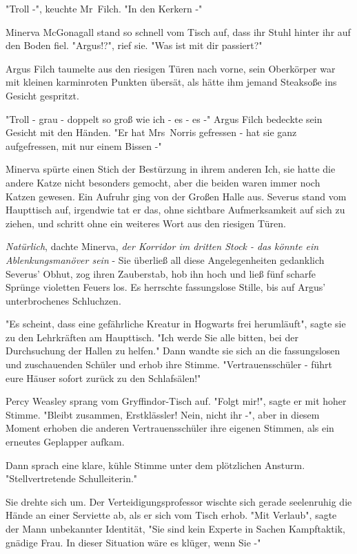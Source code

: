 {"Troll -", keuchte Mr~Filch. "In den Kerkern -"

Minerva McGonagall stand so schnell vom Tisch auf, dass ihr Stuhl hinter ihr auf den Boden fiel. "Argus!?", rief sie. "Was ist mit dir passiert?"

Argus Filch taumelte aus den riesigen Türen nach vorne, sein Oberkörper war mit kleinen karminroten Punkten übersät, als hätte ihm jemand Steaksoße ins Gesicht gespritzt.

"Troll - grau - doppelt so groß wie ich - es - es -" Argus Filch bedeckte sein Gesicht mit den Händen. "Er hat Mrs~Norris gefressen - hat sie ganz aufgefressen, mit nur einem Bissen -"

Minerva spürte einen Stich der Bestürzung in ihrem anderen Ich, sie hatte die andere Katze nicht besonders gemocht, aber die beiden waren immer noch Katzen gewesen. Ein Aufruhr ging von der Großen Halle aus. Severus stand vom Haupttisch auf, irgendwie tat er das, ohne sichtbare Aufmerksamkeit auf sich zu ziehen, und schritt ohne ein weiteres Wort aus den riesigen Türen.

\emph{Natürlich}, dachte Minerva, \emph{der Korridor im dritten Stock - das könnte ein Ablenkungsmanöver sein} - Sie überließ all diese Angelegenheiten gedanklich Severus' Obhut, zog ihren Zauberstab, hob ihn hoch und ließ fünf scharfe Sprünge violetten Feuers los. Es herrschte fassungslose Stille, bis auf Argus' unterbrochenes Schluchzen.

"Es scheint, dass eine gefährliche Kreatur in Hogwarts frei herumläuft", sagte sie zu den Lehrkräften am Haupttisch. "Ich werde Sie alle bitten, bei der Durchsuchung der Hallen zu helfen." Dann wandte sie sich an die fassungslosen und zuschauenden Schüler und erhob ihre Stimme. "Vertrauensschüler - führt eure Häuser sofort zurück zu den Schlafsälen!"

Percy Weasley sprang vom Gryffindor-Tisch auf. "Folgt mir!", sagte er mit hoher Stimme. "Bleibt zusammen, Erstklässler! Nein, nicht ihr -", aber in diesem Moment erhoben die anderen Vertrauensschüler ihre eigenen Stimmen, als ein erneutes Geplapper aufkam.

Dann sprach eine klare, kühle Stimme unter dem plötzlichen Ansturm. "Stellvertretende Schulleiterin."

Sie drehte sich um. Der Verteidigungsprofessor wischte sich gerade seelenruhig die Hände an einer Serviette ab, als er sich vom Tisch erhob. "Mit Verlaub", sagte der Mann unbekannter Identität, "Sie sind kein Experte in Sachen Kampftaktik, gnädige Frau. In dieser Situation wäre es klüger, wenn Sie -"

}
